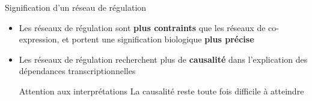 	
\begin{frame}{Signification d'un réseau de régulation}
\begin{itemize}
    \item Les réseaux de régulation sont \textbf{plus contraints} que les réseaux de co-expression, et portent une signification biologique \textbf{plus précise}
    \item Les réseaux de régulation recherchent plus de \textbf{causalité} dans l'explication des dépendances transcriptionnelles
    \vspace{0.5cm}
    \begin{alertblock}{Attention aux interprétations}
    La causalité reste toute fois difficile à atteindre
    \end{alertblock}
    
    
\end{itemize}
	\end{frame}


	


